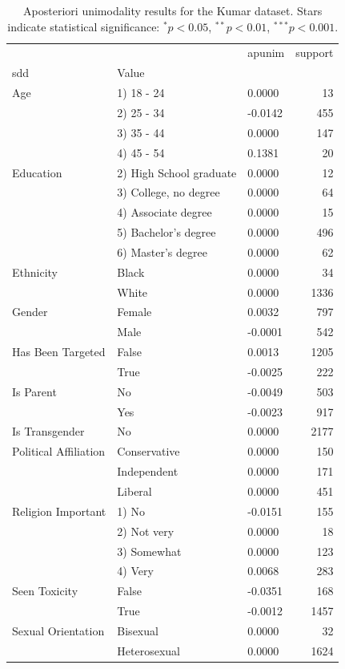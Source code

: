 \begin{table}[t]
\centering
\caption{Aposteriori unimodality results for the Kumar dataset. Stars indicate statistical significance: $^{*}p<0.05$, $^{**}p<0.01$, $^{***}p<0.001$.}
\label{tab:kumar-results}
\begin{tabular}{lllr}
\toprule
 &  & apunim & support \\
\ac{sdd} & Value &  &  \\
\midrule
Age & 1) 18 - 24 & 0.0000 & 13 \\
 & 2) 25 - 34 & -0.0142 & 455 \\
 & 3) 35 - 44 & 0.0000 & 147 \\
 & 4) 45 - 54 & 0.1381 & 20 \\
Education & 2) High School graduate & 0.0000 & 12 \\
 & 3) College, no degree & 0.0000 & 64 \\
 & 4) Associate degree & 0.0000 & 15 \\
 & 5) Bachelor's degree & 0.0000 & 496 \\
 & 6) Master's degree & 0.0000 & 62 \\
Ethnicity & Black & 0.0000 & 34 \\
 & White & 0.0000 & 1336 \\
Gender & Female & 0.0032 & 797 \\
 & Male & -0.0001 & 542 \\
Has Been Targeted & False & 0.0013 & 1205 \\
 & True & -0.0025 & 222 \\
Is Parent & No & -0.0049 & 503 \\
 & Yes & -0.0023 & 917 \\
Is Transgender & No & 0.0000 & 2177 \\
Political Affiliation & Conservative & 0.0000 & 150 \\
 & Independent & 0.0000 & 171 \\
 & Liberal & 0.0000 & 451 \\
Religion Important & 1) No & -0.0151 & 155 \\
 & 2) Not very & 0.0000 & 18 \\
 & 3) Somewhat & 0.0000 & 123 \\
 & 4) Very & 0.0068 & 283 \\
Seen Toxicity & False & -0.0351 & 168 \\
 & True & -0.0012 & 1457 \\
Sexual Orientation & Bisexual & 0.0000 & 32 \\
 & Heterosexual & 0.0000 & 1624 \\

\end{tabular}
\end{table}
